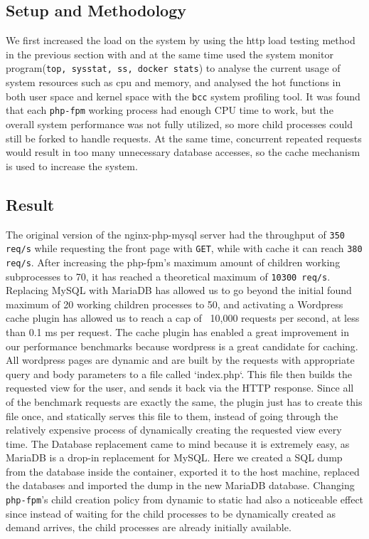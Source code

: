 \subsection{Setup and Methodology}

We first increased the load on the system by using the http load testing method in the previous section with  and at the same time used the system monitor program(\texttt{top, sysstat, ss, docker stats}) to analyse the current usage of system resources such as cpu and memory, and analysed the hot functions in both user space and kernel space with the \texttt{bcc} system profiling tool. It was found that each \texttt{php-fpm} working process had enough CPU time to work, but the overall system performance was not fully utilized, so more child processes could still be forked to handle requests. At the same time, concurrent repeated requests would result in too many unnecessary database accesses, so the cache mechanism is used to increase the system.

\subsection{Result}

The original version of the nginx-php-mysql server had the throughput of \texttt{350 req/s} while requesting the front page with \texttt{GET}, while with cache it can reach \texttt{380 req/s}. After increasing the php-fpm's maximum amount of children working subprocesses to 70, it has reached a theoretical maximum of \texttt{10300 req/s}.
Replacing MySQL with MariaDB has allowed us to go beyond the initial found maximum of 20 working children processes to 50, and activating a Wordpress cache plugin has allowed us to reach a cap of ~10,000 requests per second, at less than 0.1 ms per request.
The cache plugin has enabled a great improvement in our performance benchmarks because wordpress is a great candidate for caching. All wordpress pages are dynamic and are built by the requests with appropriate query and body parameters to a file called `index.php`. This file then builds the requested view for the user, and sends it back via the HTTP response. Since all of the benchmark requests are exactly the same, the plugin just has to create this file once, and statically serves this file to them, instead of going through the relatively expensive process of dynamically creating the requested view every time.
The Database replacement came to mind because it is extremely easy, as MariaDB is a drop-in replacement for MySQL. Here we created a SQL dump from the database inside the container, exported it to the host machine, replaced the databases and imported the dump in the new MariaDB database.
Changing \texttt{php-fpm}'s child creation policy from dynamic to static had also a noticeable effect since instead of waiting for the child processes to be dynamically created as demand arrives, the child processes are already initially available. 


